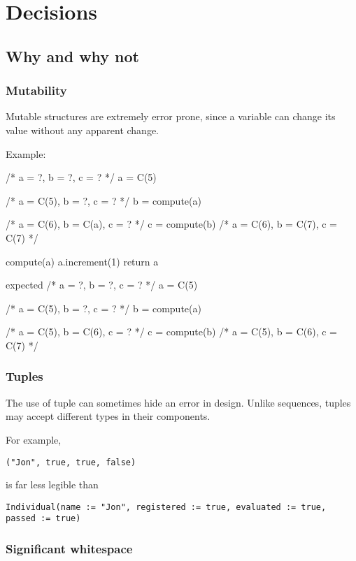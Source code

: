 \chapter{Decisions}


\section{Why and why not}

\subsection{Mutability}
Mutable structures are extremely error prone, since a variable can change its value without any apparent change.

Example:

/* a = ?, b = ?, c = ? */
a = C(5)

/* a = C(5), b = ?, c = ? */
b = compute(a)

/* a = C(6), b = C(a), c = ? */
c = compute(b)
/* a = C(6), b = C(7), c = C(7) */


compute(a)
a.increment(1)
return a


expected
/* a = ?, b = ?, c = ? */
a = C(5)

/* a = C(5), b = ?, c = ? */
b = compute(a)

/* a = C(5), b = C(6), c = ? */
c = compute(b)
/* a = C(5), b = C(6), c = C(7) */

\subsection{Tuples}

The use of tuple can sometimes hide an error in design.
Unlike sequences, tuples may accept different types in their components.

For example,

\begin{lstlisting}[label={lst:exampleJonTuple}]
  ("Jon", true, true, false)
\end{lstlisting}

is far less legible than

\begin{lstlisting}[label={lst:exampleJonIndividual}]
  Individual(name := "Jon", registered := true, evaluated := true, passed := true)
\end{lstlisting}

\subsection{Significant whitespace}

